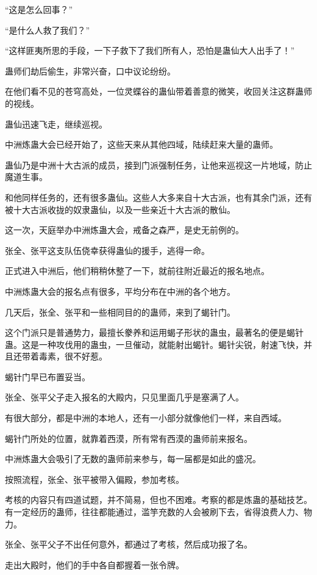 \begin{this_body}
“这是怎么回事？”

“是什么人救了我们？”

“这样匪夷所思的手段，一下子救下了我们所有人，恐怕是蛊仙大人出手了！”

蛊师们劫后偷生，非常兴奋，口中议论纷纷。

在他们看不见的苍穹高处，一位灵蝶谷的蛊仙带着善意的微笑，收回关注这群蛊师的视线。

蛊仙迅速飞走，继续巡视。

中洲炼蛊大会已经开始了，这些天来从其他四域，陆续赶来大量的蛊师。

蛊仙乃是中洲十大古派的成员，接到门派强制任务，让他来巡视这一片地域，防止魔道生事。

和他同样任务的，还有很多蛊仙。这些人大多来自十大古派，也有其余门派，还有被十大古派收拢的奴隶蛊仙，以及一些亲近十大古派的散仙。

这一次，天庭举办中洲炼蛊大会，戒备之森严，是史无前例的。

张全、张平这支队伍侥幸获得蛊仙的援手，逃得一命。

正式进入中洲后，他们稍稍休整了一下，就前往附近最近的报名地点。

中洲炼蛊大会的报名点有很多，平均分布在中洲的各个地方。

几天后，张全、张平和一些相同目的的蛊师，来到了蝎针门。

这个门派只是普通势力，最擅长豢养和运用蝎子形状的蛊虫，最著名的便是蝎针蛊。这是一种攻伐用的蛊虫，一旦催动，就能射出蝎针。蝎针尖锐，射速飞快，并且还带着毒素，很不好惹。

蝎针门早已布置妥当。

张全、张平父子走入报名的大殿内，只见里面几乎是塞满了人。

有很大部分，都是中洲的本地人，还有一小部分就像他们一样，来自西域。

蝎针门所处的位置，就靠着西漠，所有常有西漠的蛊师前来报名。

中洲炼蛊大会吸引了无数的蛊师前来参与，每一届都是如此的盛况。

按照流程，张全、张平被带入偏殿，参加考核。

考核的内容只有四道试题，并不简易，但也不困难。考察的都是炼蛊的基础技艺。有一定经历的蛊师，往往都能通过，滥竽充数的人会被刷下去，省得浪费人力、物力。

张全、张平父子不出任何意外，都通过了考核，然后成功报了名。

走出大殿时，他们的手中各自都握着一张令牌。


\end{this_body}
